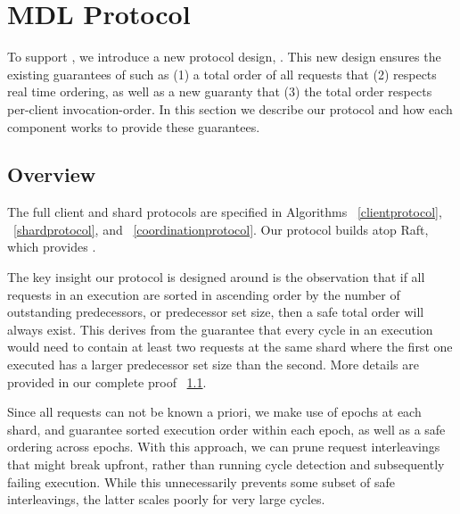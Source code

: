 

\section{MDL Protocol}
\label{sec:design}


To support \mdl, we introduce a new protocol design, \protocol. This new design ensures the existing guarantees of \sdl such as (1) a total order of all requests that (2) respects real time ordering, as well as a new guaranty that (3) the total order respects per-client invocation-order. In this section we describe our protocol and how each component works to provide these guarantees.

\subsection{Overview}
The full client and shard protocols are specified in Algorithms ~\ref{clientprotocol}, ~\ref{shardprotocol}, and ~\ref{coordinationprotocol}. Our protocol builds atop Raft, which provides \sdl. 

The key insight our protocol is designed around is the observation that if all requests in an execution are sorted in ascending order by the number of outstanding predecessors, or predecessor set size, then a safe total order will always exist. This derives from the guarantee that every cycle in an \md execution would need to contain at least two requests at the same shard where the first one executed has a larger predecessor set size than the second. More details are provided in our complete proof ~\ref{}. 

Since all requests can not be known a priori, we make use of epochs at each shard, and guarantee sorted execution order within each epoch, as well as a safe ordering across epochs. With this approach, we can prune request interleavings that might break \md upfront, rather than running cycle detection and subsequently failing execution. While this unnecessarily prevents some subset of safe interleavings, the latter scales poorly for very large cycles.

